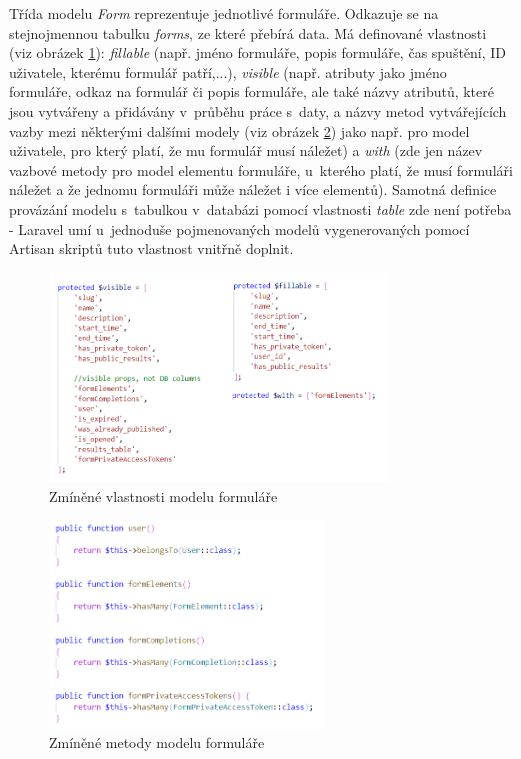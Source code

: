 	Třída modelu \textit{Form} reprezentuje jednotlivé formuláře. Odkazuje se na stejnojmennou tabulku \textit{forms}, ze které přebírá data. Má definované vlastnosti (viz obrázek \ref{fig:model_vlastnosti}): \textit{fillable} (např. jméno formuláře, popis formuláře, čas spuštění, ID uživatele, kterému formulář patří,...), \textit{visible} (např. atributy jako jméno formuláře, odkaz na formulář či popis formuláře, ale také názvy atributů, které jsou vytvářeny a přidávány v~průběhu práce s~daty, a názvy metod vytvářejících vazby mezi některými dalšími modely (viz obrázek \ref{fig:model_metody}) jako např. pro model uživatele, pro který platí, že mu formulář musí náležet) a \textit{with} (zde jen název vazbové metody pro model elementu formuláře, u~kterého platí, že musí formuláři náležet a že jednomu formuláři může náležet i více elementů). Samotná definice provázání modelu s~tabulkou v~databázi pomocí vlastnosti \textit{table} zde není potřeba - Laravel umí u~jednoduše pojmenovaných modelů vygenerovaných pomocí Artisan skriptů tuto vlastnost vnitřně doplnit.
	
	\begin{figure}[H]
		\centering
		\includegraphics[width=0.8\textwidth]{img/form_model/vlastnosti.png}
		\caption{Zmíněné vlastnosti modelu formuláře}
		\label{fig:model_vlastnosti}
	\end{figure}
	
	\begin{figure}[H]
		\centering
		\includegraphics[width=0.65\textwidth]{img/form_model/metody.png}
		\caption{Zmíněné metody modelu formuláře}
		\label{fig:model_metody}
	\end{figure}
	
